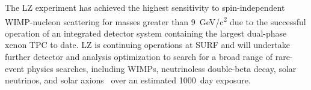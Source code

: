 \documentclass[%
 reprint,
 superscriptaddress,
 amsmath,amssymb,
 prl,
floatfix,
]{revtex4-2}
\begin{document}








The LZ experiment has achieved the highest sensitivity to spin-independent WIMP-nucleon scattering for masses greater than \SI{9}{GeV/c\squared} due to the successful operation of an integrated detector system containing the largest dual-phase xenon TPC to date. LZ is continuing operations at SURF and will undertake further detector and analysis optimization to search for a broad range of rare-event physics searches, including WIMPs, neutrinoless double-beta decay, solar neutrinos, and solar axions~\cite{akerib2019projected, akerib2020projected, akerib2021projected} over an estimated \SI{1000}{day} exposure.
\end{document}
